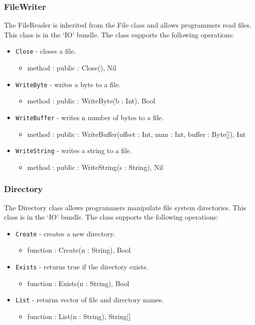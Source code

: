 \documentclass[12pt]{article}
\begin{document}
\subsubsection{FileWriter}
The FileReader is inherited from the File class and allows programmers read files.  This class is in the `IO' bundle.  The class supports the following operations:
\begin{itemize}
\item \texttt{Close} - closes a file.
  \begin{itemize}
  \item method : public : Close(), Nil
  \end{itemize}
\item \texttt{WriteByte} - writes a byte to a file.
  \begin{itemize}
  \item method : public : WriteByte(b : Int), Bool
  \end{itemize}
\item \texttt{WriteBuffer} - writes n number of bytes to a file.
  \begin{itemize}
  \item method : public : WriteBuffer(offset : Int, num : Int, buffer : Byte[]), Int
  \end{itemize}
\item \texttt{WriteString} - writes a string to a file.
  \begin{itemize}
  \item method : public : WriteString(s : String), Nil
  \end{itemize}
\end{itemize}

\subsubsection{Directory}
The Directory class allows programmers manipulate file system directories.  This class is in the `IO' bundle.  The class supports the following operations:
\begin{itemize}
\item \texttt{Create} - creates a new directory.
  \begin{itemize}
  \item function : Create(n : String), Bool
  \end{itemize}
\item \texttt{Exists} - returns true if the directory exists.
  \begin{itemize}
  \item function : Exists(n : String), Bool
  \end{itemize}
\item \texttt{List} - returns vector of file and directory names.
  \begin{itemize}
  \item function : List(n : String), String[]
  \end{itemize}
\end{itemize}
\end{document}
